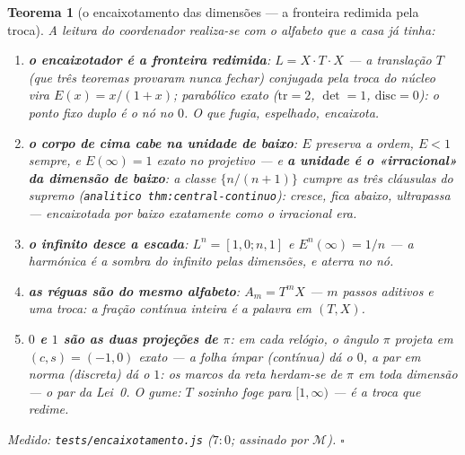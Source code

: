 \documentclass[11pt,a4paper]{article}
\newtheorem{teorema}{Teorema}
\newcommand{\code}[1]{\texttt{\small #1}}
\begin{document}
\begin{teorema}[o encaixotamento das dimensões --- a fronteira
redimida pela troca]\label{thm:encaixotamento}
A leitura do coordenador realiza-se com o alfabeto que a casa já
tinha:
\begin{enumerate}
\item \textbf{o encaixotador é a fronteira redimida}:
$L=X\cdot T\cdot X$ --- a translação $T$ (que três teoremas provaram
nunca fechar) \emph{conjugada pela troca do núcleo} vira
$E(x)=x/(1{+}x)$; parabólico exato ($\mathrm{tr}=2$, $\det=1$,
$\mathrm{disc}=0$): o ponto fixo duplo é \emph{o nó no $0$}. O que
fugia, espelhado, encaixota.
\item \textbf{o corpo de cima cabe na unidade de baixo}: $E$
preserva a ordem, $E<1$ sempre, e $E(\infty)=1$ exato no projetivo
--- e \textbf{a unidade é o «irracional» da dimensão de baixo}: a
classe $\{n/(n{+}1)\}$ cumpre as três cláusulas do supremo
(\code{analitico thm:central-continuo}): cresce, fica abaixo, ultrapassa
--- encaixotada por baixo exatamente como o irracional era.
\item \textbf{o infinito desce a escada}: $L^{n}=[1,0;n,1]$ e
$E^{n}(\infty)=1/n$ --- \emph{a harmónica é a sombra do infinito
pelas dimensões}, e aterra no nó.
\item \textbf{as réguas são do mesmo alfabeto}: $A_{m}=T^{m}X$ ---
$m$ passos aditivos e uma troca: a fração contínua inteira é a palavra
em $(T,X)$.
\item \textbf{$0$ e $1$ são as duas projeções de $\pi$}: em cada
relógio, o ângulo $\pi$ projeta em $(c,s)=(-1,0)$ exato --- a folha
ímpar (contínua) dá o $0$, a par em norma (discreta) dá o $1$: os
marcos da reta herdam-se de $\pi$ em toda dimensão --- o par da
Lei~0. O gume: $T$ sozinho foge para $[1,\infty)$ --- é a troca que
redime.
\end{enumerate}
\emph{Medido:} \code{tests/encaixotamento.js} ($7{:}0$; assinado por
$\mathcal{M}$).
$\square$
\end{teorema}
\end{document}

